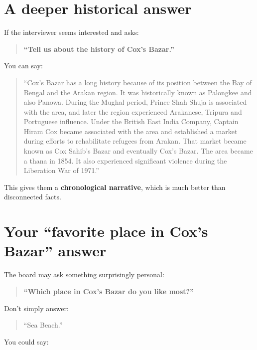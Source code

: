 \medskip

\section{A deeper historical answer}

If the interviewer seems interested and asks:

\begin{quote}
\textbf{``Tell us about the history of Cox's Bazar.''}\\
\end{quote}

You can say:

\begin{quote}
``Cox's Bazar has a long history because of its position between the Bay of Bengal and the Arakan region. It was historically known as Palongkee and also Panowa. During the Mughal period, Prince Shah Shuja is associated with the area, and later the region experienced Arakanese, Tripura and Portuguese influence. Under the British East India Company, Captain Hiram Cox became associated with the area and established a market during efforts to rehabilitate refugees from Arakan. That market became known as Cox Sahib's Bazar and eventually Cox's Bazar. The area became a thana in 1854. It also experienced significant violence during the Liberation War of 1971.''\\
\end{quote}

This gives them a \textbf{chronological narrative}, which is much better than disconnected facts.

\medskip

\section{Your ``favorite place in Cox's Bazar'' answer}

The board may ask something surprisingly personal:

\begin{quote}
\textbf{``Which place in Cox's Bazar do you like most?''}\\
\end{quote}

Don't simply answer:

\begin{quote}
``Sea Beach.''\\
\end{quote}

You could say:

